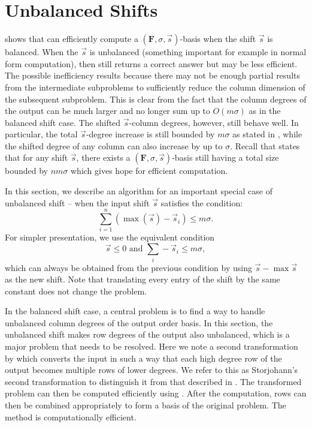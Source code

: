 
\section{Unbalanced Shifts}

\label{sec:Unbalanced-Shift}

 shows that  can efficiently
compute a $\left(\mathbf{F},\sigma,\vec{s}\right)$-basis when the
shift $\vec{s}$ is balanced. When the $\vec{s}$ is unbalanced (something
important for example in normal form computation), then 
still returns a correct answer but may be less efficient. The possible
inefficiency results because there may not be enough partial results
from the intermediate subproblems to sufficiently reduce the column
dimension of the subsequent subproblem. This is clear from the fact
that the column degrees of the output can be much larger and no longer
sum up to $O\left(m\sigma\right)$ as in the balanced shift case.
The shifted $\vec{s}$-column degrees, however, still behave well.
In particular, the total $\vec{s}$-degree increase is still bounded
by $m\sigma$ as stated in , while the shifted
degree of any column can also increase by up to $\sigma$. Recall
that  states that for any shift $\vec{s}$, there
exists a $\left(\mathbf{F},\sigma,\vec{s}\right)$-basis still having
a total size bounded by $nm\sigma$ which gives hope for efficient
computation.

In this section, we describe an algorithm for an important special
case of unbalanced shift -- when the input shift $\vec{s}$ satisfies
the condition:\[
\sum_{i=1}^{n}(\max(\vec{s})-\vec{s}_{i})\le m\sigma.\]
 For simpler presentation, we use the equivalent condition \begin{equation}
\vec{s}\le0\mbox{ and }\sum_{i}-\vec{s}_{i}\le m\sigma,\label{con:unbalancedCondition}\end{equation}
 which can always be obtained from the previous condition by using
$\vec{s}-\max\vec{s}$ as the new shift. Note that translating every
entry of the shift by the same constant does not change the problem.

In the balanced shift case, a central problem is to find a way to
handle unbalanced column degrees of the output order basis. In this
section, the unbalanced shift makes row degrees of the output also
unbalanced, which is a major problem that needs to be resolved. Here
we note a second transformation by \citet{Storjohann:2006} which
converts the input in such a way that each high degree row of the
output becomes multiple rows of lower degrees. We refer to this as
Storjohann's second transformation to distinguish it from that described
in . The transformed problem
can then be computed efficiently using . After
the computation, rows can then be combined appropriately to form a
basis of the original problem. The method is computationally efficient.


